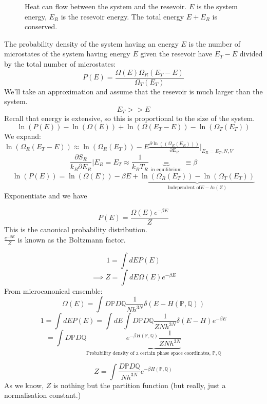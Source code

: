\documentclass[11pt]{book}
\theoremstyle{definition}
\begin{document}
\begin{figure}[htpb]
\begin{center}
\end{center}
\caption{Heat can flow between the system and the resevoir. $ E $ is the system energy, $ E_R $ is the resevoir energy. The total energy $E + E_R$ is conserved.}
\label{fig:0603-01}
\end{figure}
The probability density of the system having an energy $ E $ is the number of microstates of the system having energy $ E $ given the resevoir have $ E_T - E $ divided by the total number of microstates:
\[ P(E) = \frac{\Omega(E)\Omega_R(E_T-E)}{\Omega_T(E_T)} \] 
We'll take an approximation and assume that the resevoir is much larger than the system.
\[ E_T >> E \] 
Recall that energy is extensive, so this is proportional to the size of the system.
\[ \ln(P(E)) - \ln(\Omega(E)) + \ln(\Omega(E_T-E))-\ln(\Omega_T(E_T))    \] 
We expand: $ \ln(\Omega_R(E_T-E)) \approx \ln(\Omega_R(E_T)) - E \frac{\partial \ln((\Omega_R(E_R))) }{\partial E_R} \vert_{E_R=E_T, N,V} $ 
\[ \frac{\partial S_R}{k_B\partial E_R} \vert{E_R=E_T} \approx \frac{1}{k_BT_R} \underbrace{=}_{\text{in equilibrium}} \equiv \beta\] 
\[ \ln(P(E)) = \ln(\Omega(E)) - \beta E + \underbrace{\ln(\Omega_R(E_T)) - \ln(\Omega_T(E_T))}_{\text{Independent of} E - ln(Z)} \] 
Exponentiate and we have
\begin{shaded}
	\[ P(E) = \frac{\Omega(E)e^{-\beta E}}{Z} \] 
	This is the canonical probability distribution. \\
	$ \frac{e^{-\beta E}}{Z} $ is known as the Boltzmann factor.
\end{shaded}

\[ 1 = \int dE P(E) \] 
\[ \implies Z = \int dE \Omega(E) e^{-\beta E} \] 
From microcanonical ensemble: \[ \Omega(E) = \int D\mathbb{P}D\mathbb{Q} \frac{1}{Nh^{3N}} \delta(E-H(\mathbb{P},\mathbb{Q})) \] 
\[ 1 = \int dE P(E) = \int dE \int D\mathbb{P}D\mathbb{Q} \frac{1}{ZNh^{3N}}\delta(E-H)e^{-\beta E}  \] 
\[ = \int D\mathbb{P}D\mathbb{Q} \underbrace{e^{-\beta H(\mathbb{P},\mathbb{Q})} \frac{1}{ZNh^{3N}}}_{\text{Probability density of a certain phase space coordinates, } \mathbb{P},\mathbb{Q} }  \] 
\begin{shaded*}
\[ Z = \int  \frac{D\mathbb{P}D\mathbb{Q}}{Nh^{3N}} e^{-\beta H(\mathbb{P},\mathbb{Q})}  \] 
As we know, $ Z $ is nothing but the partition function (but really, just a normalisation constant.)
\end{shaded*}
\end{document}
